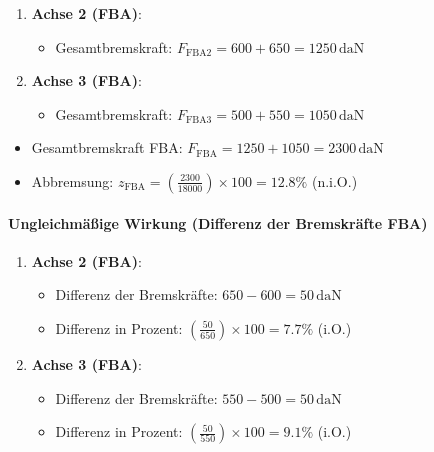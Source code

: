 \documentclass{vorlage-design-main}
\begin{document}
\begin{enumerate}
\def\labelenumi{\arabic{enumi}.}

\item
  \textbf{Achse 2 (FBA)}:

  \begin{itemize}
  
  \item
    Gesamtbremskraft:
    $F_{\text{FBA2}} = 600 + 650 = 1250 \, \text{daN}$
  \end{itemize}
\item
  \textbf{Achse 3 (FBA)}:

  \begin{itemize}
  
  \item
    Gesamtbremskraft:
    $F_{\text{FBA3}} = 500 + 550 = 1050 \, \text{daN}$
  \end{itemize}
\end{enumerate}

\begin{itemize}

\item
  Gesamtbremskraft FBA:
  $F_{\text{FBA}} = 1250 + 1050 = 2300 \, \text{daN}$
\item
  Abbremsung:
  $z_{\text{FBA}} = \left( \frac{2300}{18000} \right) \times 100 = 12.8\%$
  (n.i.O.)
\end{itemize}

\paragraph{Ungleichmäßige Wirkung (Differenz der Bremskräfte
FBA)}\label{ungleichmaessige-wirkung-differenz-der-bremskraefte-fba}

\begin{enumerate}
\def\labelenumi{\arabic{enumi}.}

\item
  \textbf{Achse 2 (FBA)}:

  \begin{itemize}
  
  \item
    Differenz der Bremskräfte: $650 - 600 = 50 \, \text{daN}$
  \item
    Differenz in Prozent:
    $\left( \frac{50}{650} \right) \times 100 = 7.7\%$ (i.O.)
  \end{itemize}
\item
  \textbf{Achse 3 (FBA)}:

  \begin{itemize}
  
  \item
    Differenz der Bremskräfte: $550 - 500 = 50 \, \text{daN}$
  \item
    Differenz in Prozent:
    $\left( \frac{50}{550} \right) \times 100 = 9.1\%$ (i.O.)
  \end{itemize}
\end{enumerate}
\end{document}
